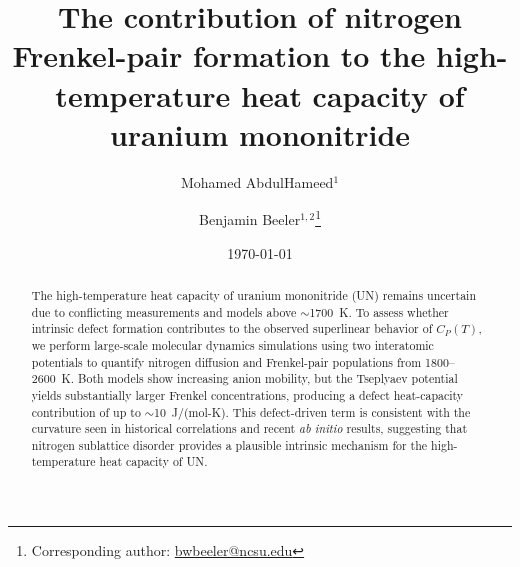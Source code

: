 \documentclass[
preprint, linenumbers,
amsmath, amssymb, aps, physrev,
]{revtex4-2}
\newcommand{\?}{\stackrel{?}{=}}
\begin{document}

\title{The contribution of nitrogen Frenkel-pair formation to the high-temperature heat capacity of uranium mononitride}


\author{Mohamed AbdulHameed$^{1}$}
\author{Benjamin Beeler$^{1,2}$\thanks{Corresponding author: \href{mailto:bwbeeler@ncsu.edu}{bwbeeler@ncsu.edu}}}


\date{\today}

\begin{abstract}
The high-temperature heat capacity of uranium mononitride (UN) remains uncertain due to conflicting measurements and models above $\sim$1700~K. To assess whether intrinsic defect formation contributes to the observed superlinear behavior of $C_P(T)$, we perform large-scale molecular dynamics simulations using two interatomic potentials to quantify nitrogen diffusion and Frenkel-pair populations from 1800--2600~K. Both models show increasing anion mobility, but the Tseplyaev potential yields substantially larger Frenkel concentrations, producing a defect heat-capacity contribution of up to $\sim$10~J/(mol-K). This defect-driven term is consistent with the curvature seen in historical correlations and recent \textit{ab initio} results, suggesting that nitrogen sublattice disorder provides a plausible intrinsic mechanism for the high-temperature heat capacity of UN. %
\end{abstract}

\maketitle
\end{document}

